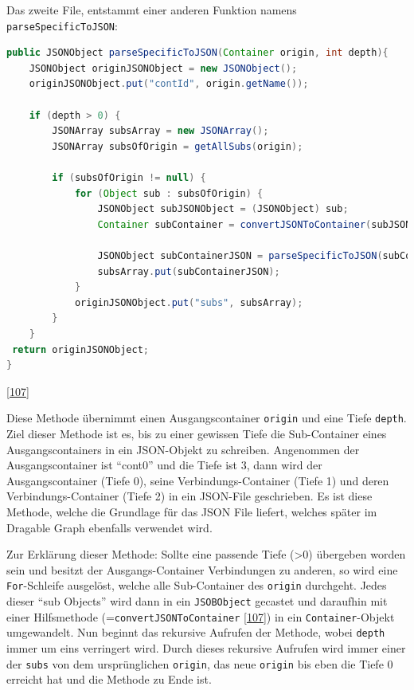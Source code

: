 \documentclass[
    headings=optiontotocandhead,%
    twoside,
    numbers=noenddot,%
    12pt, %
    titlepage, %
    parskip=full, %
    listof=leveldown, 
    numbers=noenddot, %
    a4paper,DIV=14,
    BCOR=15mm,
]{scrbook}
\newcommand{\passthrough}[1]{#1}
\begin{document}
Das zweite File, entstammt einer anderen Funktion namens
\passthrough{\lstinline!parseSpecificToJSON!}:

\begin{lstlisting}[language=Java, caption={parseSpecificToJSON Methode}]
public JSONObject parseSpecificToJSON(Container origin, int depth){ 
    JSONObject originJSONObject = new JSONObject();
    originJSONObject.put("contId", origin.getName());
    
    if (depth > 0) {
        JSONArray subsArray = new JSONArray();
        JSONArray subsOfOrigin = getAllSubs(origin);
  
        if (subsOfOrigin != null) {
            for (Object sub : subsOfOrigin) {
                JSONObject subJSONObject = (JSONObject) sub;
                Container subContainer = convertJSONToContainer(subJSONObject);
  
                JSONObject subContainerJSON = parseSpecificToJSON(subContainer, depth -1);
                subsArray.put(subContainerJSON);
            }
            originJSONObject.put("subs", subsArray);
        }
    }
 return originJSONObject;
}
\end{lstlisting}

{[}\protect\hyperlink{ref-gpt-SpecificJson}{107}{]}

Diese Methode übernimmt einen Ausgangscontainer
\passthrough{\lstinline!origin!} und eine Tiefe
\passthrough{\lstinline!depth!}. Ziel dieser Methode ist es, bis zu
einer gewissen Tiefe die Sub-Container eines Ausgangscontainers in ein
JSON-Objekt zu schreiben. Angenommen der Ausgangscontainer ist ``cont0''
und die Tiefe ist 3, dann wird der Ausgangscontainer (Tiefe 0), seine
Verbindungs-Container (Tiefe 1) und deren Verbindungs-Container (Tiefe
2) in ein JSON-File geschrieben. Es ist diese Methode, welche die
Grundlage für das JSON File liefert, welches später im Dragable Graph
ebenfalls verwendet wird.

Zur Erklärung dieser Methode: Sollte eine passende Tiefe (\textgreater0)
übergeben worden sein und besitzt der Ausgangs-Container Verbindungen zu
anderen, so wird eine \passthrough{\lstinline!For!}-Schleife ausgelöst,
welche alle Sub-Container des \passthrough{\lstinline!origin!}
durchgeht. Jedes dieser ``sub Objects'' wird dann in ein
\passthrough{\lstinline!JSOBObject!} gecastet und daraufhin mit einer
Hilfsmethode (=\passthrough{\lstinline!convertJSONToContainer!}
{[}\protect\hyperlink{ref-gpt-SpecificJson}{107}{]}) in ein
\passthrough{\lstinline!Container!}-Objekt umgewandelt. Nun beginnt das
rekursive Aufrufen der Methode, wobei \passthrough{\lstinline!depth!}
immer um eins verringert wird. Durch dieses rekursive Aufrufen wird
immer einer der \passthrough{\lstinline!subs!} von dem ursprünglichen
\passthrough{\lstinline!origin!}, das neue
\passthrough{\lstinline!origin!} bis eben die Tiefe 0 erreicht hat und
die Methode zu Ende ist.
\end{document}
